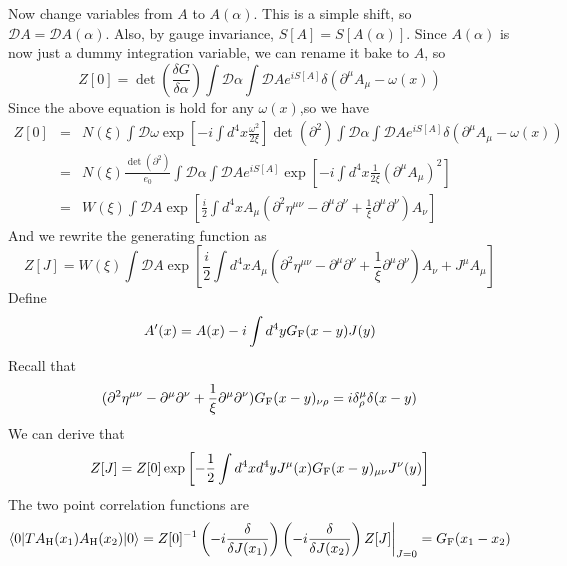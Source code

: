 Now change variables from $A$ to $A(\alpha)$. This is a simple shift, so $\mathcal{D}A = \mathcal{D}A(\alpha)$. Also, by gauge invariance, $S[A] = S[A(\alpha)]$. Since $A(\alpha)$ is now just a dummy integration variable, we can rename it bake to $A$, so
\[Z[0] = \det \left( \frac{\delta G}{\delta \alpha} \right) \int \mathcal{D}\alpha \int \mathcal{D}A e^{iS[A]} \delta(\partial^{\mu}A_{\mu} - \omega(x))\]
Since the above equation is hold for any $\omega(x)$,so we have
\begin{eqnarray}
Z[0] &=& N(\xi) \int \mathcal{D}\omega \exp\left[ -i \int d^4x \frac{\omega^2}{2\xi} \right] \det(\partial^2) \int \mathcal{D}\alpha \int \mathcal{D}A e^{iS[A]} \delta(\partial^{\mu}A_{\mu} - \omega(x)) \nonumber \\
&=& N(\xi) \frac{\det(\partial^2)}{e_0} \int \mathcal{D}\alpha \int \mathcal{D}A e^{iS[A]} \exp\left[ -i \int d^4x \frac{1}{2\xi} (\partial^{\mu}A_{\mu})^2\right] \nonumber \\
&=& W(\xi) \int \mathcal{D}A \exp\left[ \frac{i}{2} \int d^4x  A_{\mu} (\partial^2\eta^{\mu\nu} - \partial^{\mu}\partial^{\nu} + \frac{1}{\xi} \partial^{\mu} \partial^{\nu})A_{\nu}\right] \nonumber
\end{eqnarray}
And we rewrite the generating function as
\[Z[J] = W(\xi) \int \mathcal{D}A \exp\left[ \frac{i}{2} \int d^4x  A_{\mu} (\partial^2\eta^{\mu\nu} - \partial^{\mu}\partial^{\nu} + \frac{1}{\xi} \partial^{\mu} \partial^{\nu})A_{\nu} + J^{\mu} A_{\mu}\right]\]
Define
\[A'(x) = A(x) - i \int d^4y G_{\rm F}(x-y)J(y)\]
Recall that
\[(\partial^2\eta^{\mu\nu} - \partial^{\mu}\partial^{\nu} + \frac{1}{\xi} \partial^{\mu} \partial^{\nu})G_{\rm F}(x-y)_{\nu \rho} = i\delta^{\mu}_{\rho}\delta(x-y)\]
We can derive that
\[Z[J]=Z[0] \exp \left[ -\frac{1}{2} \int d^4x d^4y J^{\mu}(x) G_{\rm F}(x-y)_{\mu\nu}J^{\nu}(y) \right]\]
The two point correlation functions are
\[\langle 0 | T A_{\rm H}(x_1) A_{\rm H}(x_2)| 0 \rangle = Z[0]^{-1} \left(-i \frac{\delta}{\delta J(x_1)} \right) \left(-i \frac{\delta}{\delta J(x_2)} \right) Z[J]\bigg|_{J=0} = G_{\rm F}(x_1-x_2) \]

